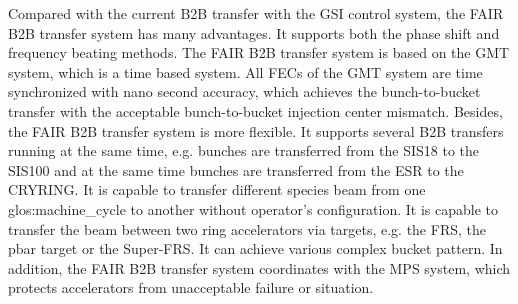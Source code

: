 Compared with the current B2B transfer with the GSI control system, the FAIR B2B transfer system has many advantages. It supports both the phase shift and frequency beating methods. 
The FAIR B2B transfer system is based on the GMT system, which is a time based system. All FECs of the GMT system are time synchronized with nano second accuracy, which achieves the bunch-to-bucket transfer with the acceptable bunch-to-bucket injection center mismatch. Besides, the FAIR B2B transfer system is more flexible. It supports several B2B transfers running at the same time, e.g. bunches are transferred from the SIS18 to the SIS100 and at the same time bunches are transferred from the ESR to the CRYRING. It is capable to transfer different species beam from one \gls{glos:machine_cycle} to another without operator's configuration. It is capable to transfer the beam between two ring accelerators via targets, e.g. the \gls{FRS}, the pbar target or the Super-FRS. It can achieve various complex bucket pattern. In addition, the FAIR B2B transfer system coordinates with the MPS system, which protects accelerators from unacceptable failure or situation. 


